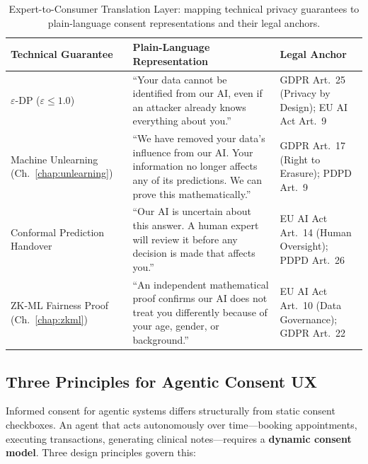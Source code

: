 \begin{table}[ht]
\centering
\caption{Expert-to-Consumer Translation Layer: mapping technical privacy guarantees to plain-language consent representations and their legal anchors.}
\label{tab:consent_translation}
\renewcommand{\arraystretch}{1.4}
\begin{tabular}{p{3.5cm} p{4.8cm} p{4.0cm}}
\toprule
\textbf{Technical Guarantee} & \textbf{Plain-Language Representation} & \textbf{Legal Anchor} \\
\midrule
$\varepsilon$-DP ($\varepsilon \leq 1.0$) &
``Your data cannot be identified from our AI, even if an attacker already knows everything about you.'' &
GDPR Art.~25 (Privacy by Design); EU AI Act Art.~9 \\

Machine Unlearning (Ch.~\ref{chap:unlearning}) &
``We have removed your data's influence from our AI. Your information no longer affects any of its predictions. We can prove this mathematically.'' &
GDPR Art.~17 (Right to Erasure); PDPD Art.~9 \\

Conformal Prediction Handover &
``Our AI is uncertain about this answer. A human expert will review it before any decision is made that affects you.'' &
EU AI Act Art.~14 (Human Oversight); PDPD Art.~26 \\

ZK-ML Fairness Proof (Ch.~\ref{chap:zkml}) &
``An independent mathematical proof confirms our AI does not treat you differently because of your age, gender, or background.'' &
EU AI Act Art.~10 (Data Governance); GDPR Art.~22 \\
\bottomrule
\end{tabular}
\end{table}

\subsection{Three Principles for Agentic Consent UX}
\label{sec:consent_ux_principles}

Informed consent for agentic systems differs structurally from static consent checkboxes. An agent that acts autonomously over time---booking appointments, executing transactions, generating clinical notes---requires a \textbf{dynamic consent model}. Three design principles govern this:

